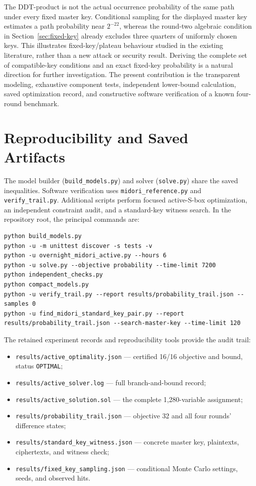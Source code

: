 \documentclass[11pt,a4paper]{article}
\begin{document}
The DDT-product is not the actual occurrence probability of the same
path under every fixed master key. Conditional sampling for the displayed
master key estimates a path probability near $2^{-22}$, whereas the
round-two algebraic condition in Section~\ref{sec:fixed-key} already
excludes three quarters of uniformly chosen keys. This illustrates
fixed-key/plateau behaviour studied in the existing literature, rather
than a new attack or security result. Deriving the complete set of
compatible-key conditions and an exact fixed-key probability is a
natural direction for further investigation. The present contribution
is the transparent modeling, exhaustive component tests, independent
lower-bound calculation, saved optimization record, and constructive
software verification of a known four-round benchmark.

\appendix
\section{Reproducibility and Saved Artifacts}
The model builder (\texttt{build\_models.py}) and solver
(\texttt{solve.py}) share the saved inequalities. Software verification
uses \texttt{midori\_reference.py} and \texttt{verify\_trail.py}.
Additional scripts perform focused active-S-box optimization, an independent
constraint audit, and a standard-key witness search. In the repository root, the principal commands are:
\begin{lstlisting}
python build_models.py
python -u -m unittest discover -s tests -v
python -u overnight_midori_active.py --hours 6
python -u solve.py --objective probability --time-limit 7200
python independent_checks.py
python compact_models.py
python -u verify_trail.py --report results/probability_trail.json --samples 0
python -u find_midori_standard_key_pair.py --report results/probability_trail.json --search-master-key --time-limit 120
\end{lstlisting}
The retained experiment records and reproducibility tools provide the audit trail:
\begin{itemize}
\item \texttt{results/active\_optimality.json} --- certified 16/16 objective and bound, status \texttt{OPTIMAL};
\item \texttt{results/active\_solver.log} --- full branch-and-bound record;
\item \texttt{results/active\_solution.sol} --- the complete 1,280-variable assignment;
\item \texttt{results/probability\_trail.json} --- objective 32 and all four rounds' difference states;
\item \texttt{results/standard\_key\_witness.json} --- concrete master key, plaintexts, ciphertexts, and witness check;
\item \texttt{results/fixed\_key\_sampling.json} --- conditional Monte Carlo settings, seeds, and observed hits.
\end{itemize}
\end{document}
